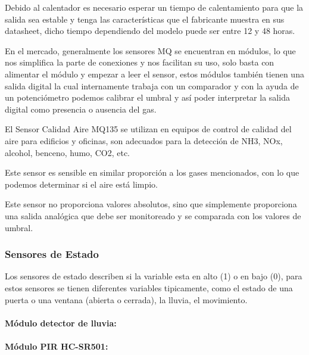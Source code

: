 Debido al calentador es necesario esperar un tiempo de calentamiento para que la salida sea estable y tenga las características que el fabricante muestra en sus datasheet, dicho tiempo dependiendo del modelo puede ser entre 12 y 48 horas.

En el mercado, generalmente los sensores MQ se encuentran en módulos, lo que nos simplifica la parte de conexiones y nos facilitan su uso, solo basta con alimentar el módulo y empezar a leer el sensor, estos módulos también tienen una salida digital la cual internamente trabaja con un comparador y con la ayuda de un potenciómetro podemos calibrar el umbral y así poder interpretar la salida digital como presencia o ausencia del gas.

El Sensor Calidad Aire MQ135 se utilizan en equipos de control de calidad del aire para edificios y oficinas, son adecuados para la detección de NH3, NOx, alcohol, benceno, humo, CO2, etc.

Este sensor es sensible en similar proporción a los gases mencionados, con lo que podemos determinar si el aire está limpio.


Este sensor no proporciona valores absolutos, sino que simplemente proporciona una salida analógica que debe ser monitoreado y se comparada con los valores de umbral.

\subsubsection{Sensores de Estado}

Los sensores de estado describen si la variable esta en alto (1) o en bajo (0), para estos sensores se tienen diferentes variables tipicamente, como el estado de una puerta o una ventana (abierta o cerrada), la lluvia, el movimiento.

\paragraph{Módulo detector de lluvia: }

\paragraph{Módulo PIR HC-SR501: }

